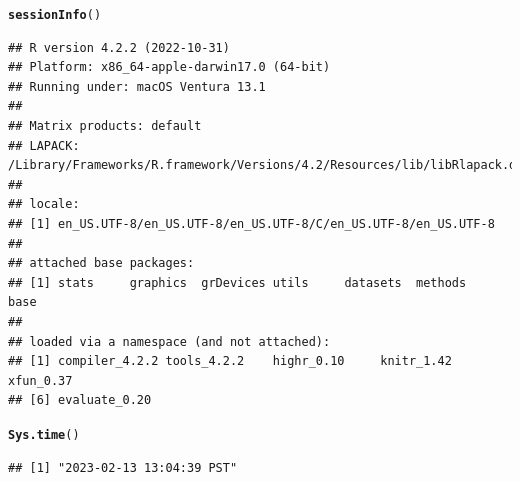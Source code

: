 \documentclass{article}\usepackage[]{graphicx}\usepackage[]{xcolor}
\makeatletter
\newcommand{\hlstd}[1]{\textcolor[rgb]{0.345,0.345,0.345}{#1}}%
\newcommand{\hlkwd}[1]{\textcolor[rgb]{0.737,0.353,0.396}{\textbf{#1}}}%
\newenvironment{kframe}{%
 \def\at@end@of@kframe{}%
 \ifinner\ifhmode%
  \def\at@end@of@kframe{\end{minipage}}%
  \begin{minipage}{\columnwidth}%
 \fi\fi%
 \def\FrameCommand##1{\hskip\@totalleftmargin \hskip-\fboxsep
 \colorbox{shadecolor}{##1}\hskip-\fboxsep
     \hskip-\linewidth \hskip-\@totalleftmargin \hskip\columnwidth}%
 \MakeFramed {\advance\hsize-\width
   \@totalleftmargin\z@ \linewidth\hsize
   \@setminipage}}%
 {\par\unskip\endMakeFramed%
 \at@end@of@kframe}
\newenvironment{knitrout}{}{} %
\makeatother
\begin{document}
\begin{knitrout}
\color{fgcolor}\begin{kframe}
\begin{alltt}
\hlkwd{sessionInfo}\hlstd{()}
\end{alltt}
\begin{verbatim}
## R version 4.2.2 (2022-10-31)
## Platform: x86_64-apple-darwin17.0 (64-bit)
## Running under: macOS Ventura 13.1
## 
## Matrix products: default
## LAPACK: /Library/Frameworks/R.framework/Versions/4.2/Resources/lib/libRlapack.dylib
## 
## locale:
## [1] en_US.UTF-8/en_US.UTF-8/en_US.UTF-8/C/en_US.UTF-8/en_US.UTF-8
## 
## attached base packages:
## [1] stats     graphics  grDevices utils     datasets  methods   base     
## 
## loaded via a namespace (and not attached):
## [1] compiler_4.2.2 tools_4.2.2    highr_0.10     knitr_1.42     xfun_0.37     
## [6] evaluate_0.20
\end{verbatim}
\begin{alltt}
\hlkwd{Sys.time}\hlstd{()}
\end{alltt}
\begin{verbatim}
## [1] "2023-02-13 13:04:39 PST"
\end{verbatim}
\end{kframe}
\end{knitrout}
\end{document}
